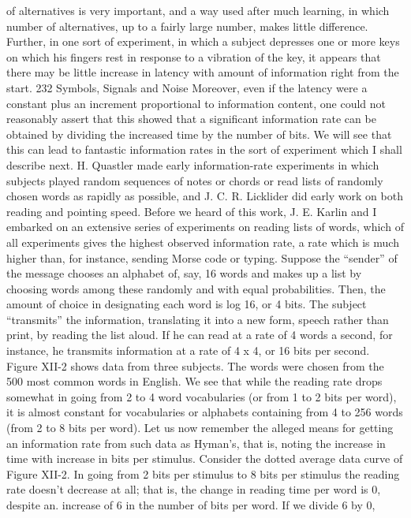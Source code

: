 {{{{{{{{{{{of alternatives is very important, and a way used after much learning,
in which number of alternatives, up to a fairly large number,
makes little difference. Further, in one sort of experiment, in which
a subject depresses one or more keys on which his fingers rest in
response to a vibration of the key, it appears that there may be
little increase in latency with amount of information right from
the start.
232 Symbols, Signals and Noise
Moreover, even if the latency were a constant plus an increment
proportional to information content, one could not reasonably
assert that this showed that a significant information rate can be
obtained by dividing the increased time by the number of bits. We
will see that this can lead to fantastic information rates in the sort
of experiment which I shall describe next.
H. Quastler made early information-rate experiments in which
subjects played random sequences of notes or chords or read lists
of randomly chosen words as rapidly as possible, and J. C. R.
Licklider did early work on both reading and pointing speed.
Before we heard of this work, J. E. Karlin and I embarked on an
extensive series of experiments on reading lists of words, which of
all experiments gives the highest observed information rate, a rate
which is much higher than, for instance, sending Morse code
or typing.
Suppose the “sender” of the message chooses an alphabet of,
say, 16 words and makes up a list by choosing words among these
randomly and with equal probabilities. Then, the amount of choice
in designating each word is log 16, or 4 bits. The subject “transmits”
the information, translating it into a new form, speech rather
than print, by reading the list aloud. If he can read at a rate of 4
words a second, for instance, he transmits information at a rate
of 4 x 4, or 16 bits per second.
Figure XII-2 shows data from three subjects. The words were
chosen from the 500 most common words in English. We see that
while the reading rate drops somewhat in going from 2 to 4 word
vocabularies (or from 1 to 2 bits per word), it is almost constant
for vocabularies or alphabets containing from 4 to 256 words
(from 2 to 8 bits per word).
Let us now remember the alleged means for getting an information
rate from such data as Hyman’s, that is, noting the increase
in time with increase in bits per stimulus. Consider the dotted
average data curve of Figure XII-2. In going from 2 bits per
stimulus to 8 bits per stimulus the reading rate doesn’t decrease
at all; that is, the change in reading time per word is 0, despite an.
increase of 6 in the number of bits per word. If we divide 6 by 0,
}}}}}}}}}}}
